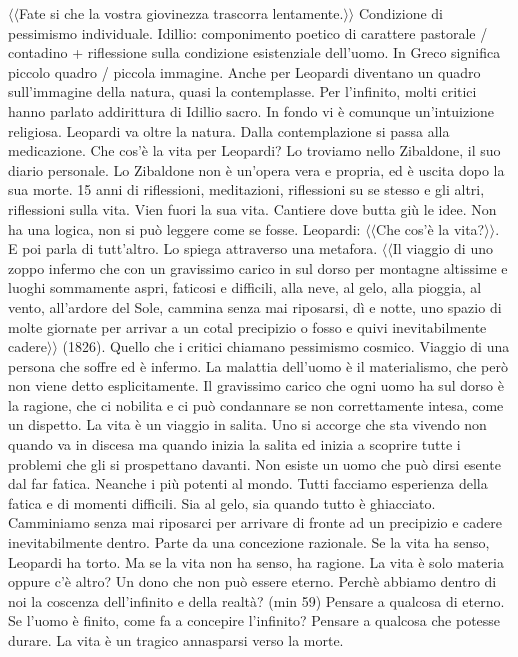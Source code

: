 \documentclass{article}
\begin{document}
    $\langle \langle$Fate si che la vostra giovinezza trascorra lentamente.$\rangle \rangle$
    \newline
    Condizione di pessimismo individuale.
    Idillio: componimento poetico di carattere pastorale / contadino + riflessione sulla condizione esistenziale dell'uomo.
    In Greco significa piccolo quadro / piccola immagine. Anche per Leopardi diventano un quadro sull'immagine della natura, quasi la
    contemplasse.
    Per l'infinito, molti critici hanno parlato addirittura di Idillio sacro. In fondo vi è comunque un'intuizione religiosa.
    Leopardi va oltre la natura. Dalla contemplazione si passa alla medicazione.
    \newline
    Che cos'è la vita per Leopardi? Lo troviamo nello Zibaldone, il suo diario personale. Lo Zibaldone non è un'opera vera e propria,
    ed è uscita dopo la sua morte. 15 anni di riflessioni, meditazioni, riflessioni su se stesso e gli altri, riflessioni sulla vita.
    Vien fuori la sua vita. Cantiere dove butta giù le idee. Non ha una logica, non si può leggere come se fosse.
    \newline
    Leopardi: $\langle \langle$Che cos'è la vita?$\rangle \rangle$. E poi parla di tutt'altro. Lo spiega attraverso una metafora. $\langle \langle$Il viaggio di uno zoppo infermo che con
    un gravissimo carico in sul dorso per montagne altissime e luoghi sommamente aspri, faticosi e difficili, alla neve, al gelo,
    alla pioggia, al vento, all'ardore del Sole, cammina senza mai riposarsi, dì e notte, uno spazio di molte giornate per arrivar a un
    cotal precipizio o fosso e quivi inevitabilmente cadere$\rangle \rangle$ (1826).
    Quello che i critici chiamano pessimismo cosmico.
    \newline
    Viaggio di una persona che soffre ed è infermo. La malattia dell'uomo è il materialismo, che però non viene detto esplicitamente.
    Il gravissimo carico che ogni uomo ha sul dorso è la ragione, che ci nobilita e ci può condannare se non correttamente intesa, come un dispetto.
    La vita è un viaggio in salita. Uno si accorge che sta vivendo non quando va in discesa ma quando inizia la salita ed inizia a scoprire tutte
    i problemi che gli si prospettano davanti. Non esiste un uomo che può dirsi esente dal far fatica. Neanche i più potenti al mondo.
    Tutti facciamo esperienza della fatica e di momenti difficili. Sia al gelo, sia quando tutto è ghiacciato.
    Camminiamo senza mai riposarci per arrivare di fronte ad un precipizio e cadere inevitabilmente dentro.
    Parte da una concezione razionale.
    \newline
    Se la vita ha senso, Leopardi ha torto. Ma se la vita non ha senso, ha ragione. La vita è solo materia oppure c'è altro?
    Un dono che non può essere eterno. Perchè abbiamo dentro di noi la coscenza dell'infinito e della realtà? (min 59) Pensare a qualcosa
    di eterno. Se l'uomo è finito, come fa a concepire l'infinito?
    Pensare a qualcosa che potesse durare. La vita è un tragico annasparsi verso la morte.
\end{document}
